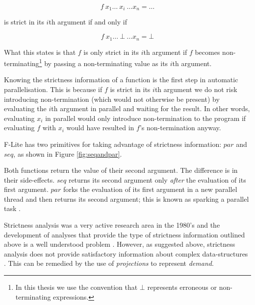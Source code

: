 $$
    f\ x_{1} \dots \ x_{i} \ \dots x_{n} = \dots
$$

\noindent is strict in its $i$th argument if and only if

$$
    f\ x_{1} \dots \ \bot \ \dots x_{n} = \bot
$$

What this states is that $f$ is only strict in its $i$th argument if $f$
becomes non-terminating\footnote{In this thesis we use the convention that
$\bot$ represents erroneous or non-terminating expressions.} by passing a
non-terminating value as its $i$th argument.

Knowing the strictness information of a function is the first step in automatic
parallelisation. This is because if $f$ is strict in its $i$th argument we do
not risk introducing non-termination (which would not otherwise be present) by
evaluating the $i$th argument in parallel and waiting for the result. In other
words, evaluating $x_{i}$ in parallel would only introduce non-termination to
the program if evaluating $f$ with $x_{i}$ would have resulted in $f$'s
non-termination anyway.

F-Lite has two primitives for taking advantage of strictness information: $par$
and $seq$, as shown in Figure \ref{fig:seqandpar}.

Both functions return the value of their second argument. The difference is in
their side-effects. $seq$ returns its second argument only \emph{after}
the evaluation of its first argument. $par$ forks the evaluation of its first
argument in a new parallel thread and then returns its second argument; this is
known as sparking a parallel task \citep{clack1986four}.

Strictness analysis was a very active research area in the 1980's and the
development of analyses that provide the type of strictness information
outlined above is a well understood problem \citep{mycroft1980theory,
clack1985strictness, burn1986strictness}.  However, as suggested above,
strictness analysis does not provide satisfactory information about complex
data-structures \citep{wadler1987strictness}. This can be remedied by the
use of \emph{projections} to represent \emph{demand}.

